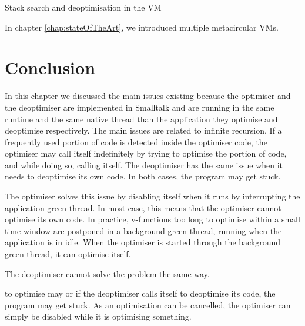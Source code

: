\documentclass[a4paper,12pt,twoside]{../includes/ThesisStyle}
\begin{document}
Stack search and deoptimisation in the VM


In chapter \ref{chap:stateOfTheArt}, we introduced multiple metacircular VMs. 



\section{Conclusion}

In this chapter we discussed the main issues existing because the optimiser and the deoptimiser are implemented in Smalltalk and are running in the same runtime and the same native thread than the application they optimise and deoptimise respectively. The main issues are related to infinite recursion. If a frequently used portion of code is detected inside the optimiser code, the optimiser may call itself indefinitely by trying to optimise the portion of code, and while doing so, calling itself. The deoptimiser has the same issue when it needs to deoptimise its own code. In both cases, the program may get stuck.

The optimiser solves this issue by disabling itself when it runs by interrupting the application green thread. In most case, this means that the optimiser cannot optimise its own code. In practice, v-functions too long to optimise within a small time window are postponed in a background green thread, running when the application is in idle. When the optimiser is started through the background green thread, it can optimise itself.

The deoptimiser cannot solve the problem the same way.

 to optimise may  or if the deoptimiser calls itself to deoptimise its code, the program may get stuck. As an optimisation can be cancelled, the optimiser can simply be disabled while it is optimising something. 


\ifx\wholebook\relax\else
    
\end{document}
